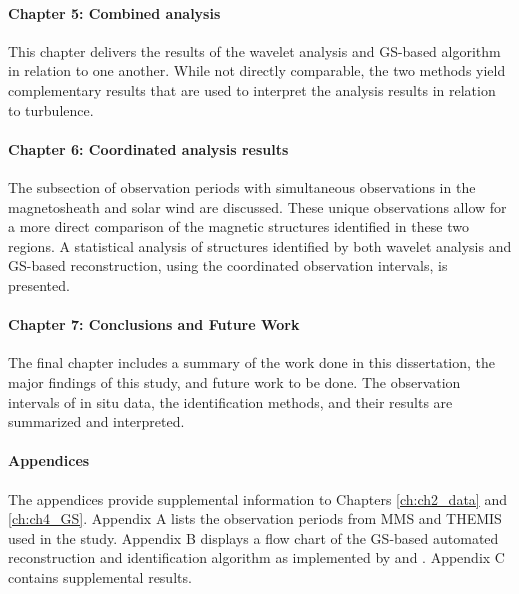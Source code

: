 \paragraph*{Chapter 5: Combined analysis}
This chapter delivers the results of the wavelet analysis and GS-based algorithm in relation to one another. While not directly comparable, the two methods yield complementary results that are used to interpret the analysis results in relation to turbulence.

\paragraph*{Chapter 6: Coordinated analysis results}
The subsection of observation periods with simultaneous observations in the magnetosheath and solar wind are discussed. These unique observations allow for a more direct comparison of the magnetic structures identified in these two regions. A statistical analysis of structures identified by both wavelet analysis and GS-based reconstruction, using the coordinated observation intervals, is presented.

\paragraph*{Chapter 7: Conclusions and Future Work}
The final chapter includes a summary of the work done in this dissertation, the major findings of this study, and future work to be done. The observation intervals of in situ data, the identification methods, and their results are summarized and interpreted.

\paragraph*{Appendices}
The appendices provide supplemental information to Chapters \ref{ch:ch2_data} and \ref{ch:ch4_GS}. Appendix A lists the observation periods from MMS and THEMIS used in the study. Appendix B displays a flow chart of the GS-based automated reconstruction and identification algorithm as implemented by \cite{Hu:2018} and \cite{Zheng:2018}. Appendix C contains supplemental results.